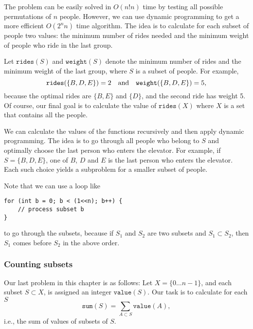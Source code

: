 The problem can be easily solved in $O(n! n)$ time
by testing all possible permutations of $n$ people.
However, we can use dynamic programming to get
a more efficient $O(2^n n)$ time algorithm.
The idea is to calculate for each subset of people
two values: the minimum number of rides needed and
the minimum weight of people who ride in the last group.

Let $\texttt{rides}(S)$ and $\texttt{weight}(S)$ denote
the minimum number of rides and the minimum
weight of the last group, where $S$ is a subset
of people. For example,
\[ \texttt{rides}(\{B,D,E\})=2 \hspace{10px} \textrm{and}
\hspace{10px} \texttt{weight}(\{B,D,E\})=5,\]
because the optimal rides are $\{B,E\}$ and $\{D\}$,
and the second ride has weight 5.
Of course, our final goal is to calculate the value
of $\texttt{rides}(X)$ where $X$ is a set that
contains all the people.

We can calculate the values
of the functions recursively and then apply
dynamic programming.
The idea is to go through all people
who belong to $S$ and optimally
choose the last person who enters the elevator.
For example, if $S=\{B,D,E\}$,
one of $B$, $D$ and $E$ is the last person
who enters the elevator.
Each such choice yields a subproblem
for a smaller subset of people.

Note that we can use a loop like
\begin{lstlisting}
for (int b = 0; b < (1<<n); b++) {
    // process subset b
}
\end{lstlisting}
to go through the subsets,
because if $S_1$ and $S_2$ are two subsets
and $S_1 \subset S_2$,
then $S_1$ comes before $S_2$ in the above order.

\subsubsection{Counting subsets}

Our last problem in this chapter is as follows:
Let $X=\{0 \ldots n-1\}$, and each subset $S \subset X$,
is assigned an integer $\texttt{value}(S)$.
Our task is to calculate for each $S$
\[\texttt{sum}(S) = \sum_{A \subset S} \texttt{value}(A),\]
i.e., the sum of values of subsets of $S$.

